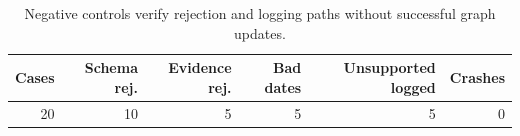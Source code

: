 \begin{table}[t]
\caption{Negative controls verify rejection and logging paths without successful graph updates.}
\label{tab:negative-controls}
\begin{tabular*}{\hsize}{@{\extracolsep{\fill}}rrrrrr@{}}
\toprule
Cases & Schema rej. & Evidence rej. & Bad dates & Unsupported logged & Crashes\\
\midrule
20 & 10 & 5 & 5 & 5 & 0\\
\bottomrule
\end{tabular*}
\end{table}
